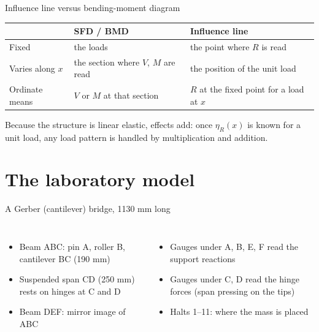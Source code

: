 \documentclass[aspectratio=169,11pt]{beamer}
\newcommand{\il}[1]{\eta_{#1}}
\begin{document}
\begin{frame}{Influence line versus bending-moment diagram}
\begin{center}
\begin{tabular}{@{}p{3.3cm}p{4.6cm}p{4.6cm}@{}}
\toprule
 & SFD / BMD & Influence line\\
\midrule
Fixed & the loads & the point where $R$ is read\\
Varies along $x$ & the section where $V$, $M$ are read & the position of the unit load\\
Ordinate means & $V$ or $M$ at that section & $R$ at the fixed point for a load at $x$\\
\bottomrule
\end{tabular}
\end{center}
\medskip
Because the structure is linear elastic, effects add: once $\il{R}(x)$ is known for a unit load, \alert{any} load pattern is handled by multiplication and addition.
\end{frame}

\section{The laboratory model}
\begin{frame}{A Gerber (cantilever) bridge, 1130 mm long}
\begin{center}\ILbridge\end{center}
\begin{columns}[T]
\begin{itemize}
  \item Beam ABC: pin A, roller B, cantilever BC (190 mm)
  \item Suspended span CD (250 mm) rests on \alert{hinges} at C and D
  \item Beam DEF: mirror image of ABC
\end{itemize}
\begin{itemize}
  \item Gauges under A, B, E, F read the \alert{support reactions}
  \item Gauges under C, D read the \alert{hinge forces} (span pressing on the tips)
  \item Halts 1--11: where the mass is placed
\end{itemize}
\end{columns}
\end{frame}
\end{document}
